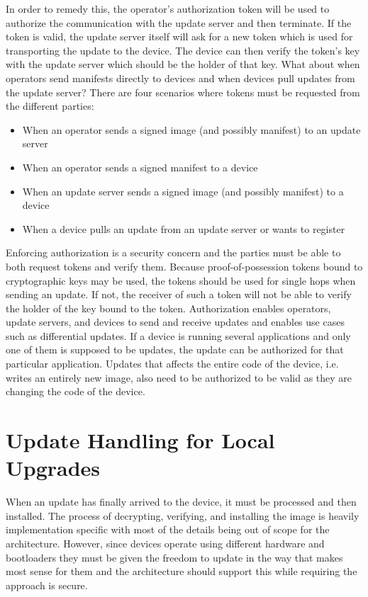 \documentclass[0-thesis.tex]{subfiles}
\begin{document}
In order to remedy this, the operator's authorization token will be used to authorize the
communication with the update server and then terminate. If the token is valid, the update
server itself will ask for a new token which is used for transporting the update to the
device. The device can then verify the token's key with the update server which should be
the holder of that key. What about when operators send manifests directly to devices and
when devices pull updates from the update server? There are four scenarios where tokens
must be requested from the different parties:

\begin{itemize}
    \item When an operator sends a signed image (and possibly manifest) to an update
            server
    \item When an operator sends a signed manifest to a device
    \item When an update server sends a signed image (and possibly manifest) to a device
    \item When a device pulls an update from an update server or wants to register
\end{itemize}

Enforcing authorization is a security concern and the parties must be able to both request
tokens and verify them. Because proof-of-possession tokens bound to cryptographic keys may
be used, the tokens should be used for single hops when sending an update. If not, the
receiver of such a token will not be able to verify the holder of the key bound to the
token. Authorization enables operators, update servers, and devices to send and receive
updates and enables use cases such as differential updates. If a device is running several
applications and only one of them is supposed to be updates, the update can be authorized
for that particular application. Updates that affects the entire code of the device, i.e.
writes an entirely new image, also need to be authorized to be valid as they are changing
the code of the device.

\section{Update Handling for Local Upgrades}
\label{sec:upgrading}
When an update has finally arrived to the device, it must be processed and then installed.
The process of decrypting, verifying, and installing the image is heavily implementation
specific with most of the details being out of scope for the architecture. However, since
devices operate using different hardware and bootloaders they must be given the freedom to
update in the way that makes most sense for them and the architecture should support this
while requiring the approach is secure.
\end{document}
